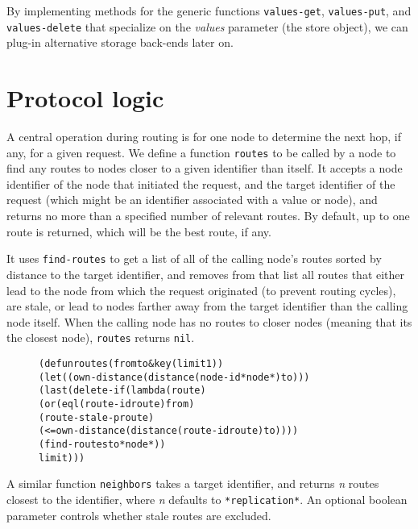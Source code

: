 \documentclass [a4paper,12pt,oneside]{article}\usepackage [paper=a4paper,left=37.5264mm,right=37.5264mm,top=37.5264mm,bottom=37.5264mm]{geometry}\usepackage {graphicx}\usepackage {tabularx}\usepackage {alltt}\usepackage {float}\usepackage [section]{placeins}\usepackage {titling}\setlength {\droptitle }{-4em}\pretitle {\begin {flushright}\bfseries \LARGE }\posttitle {\end {flushright}}\preauthor {\begin {flushright}}\postauthor {\end {flushright}}\predate {\begin {flushright}}\postdate {\end {flushright}}\usepackage [english]{babel}\usepackage [T1]{fontenc}\usepackage [utf8x]{inputenc}\usepackage {stmaryrd}\usepackage {amsfonts}\DeclareUnicodeCharacter {12314}{$\llbracket $}\DeclareUnicodeCharacter {12315}{$\rrbracket $}\DeclareUnicodeCharacter {9655}{$\rhd $}\newcommand \nobreakdash {\mbox {-}}\DeclareUnicodeCharacter {8209}{\nobreakdash }\usepackage [sc]{mathpazo}\linespread {1.05}\usepackage [font={small},labelformat=empty,labelsep=none]{caption}\tolerance=10000 \clubpenalty=10000 \widowpenalty=10000 \frenchspacing
\begin{document}
By implementing methods for the generic functions \texttt {values-get}, \texttt {values-put}, and \texttt {values-delete} that specialize on the \textit {values} parameter (the store object), we can plug-in alternative storage back-ends later on.



\section* {Protocol logic}

A central operation during routing is for one node to determine the next hop, if any, for a given request. We define a function \texttt {routes} to be called by a node to find any routes to nodes closer to a given identifier than itself. It accepts a node identifier of the node that initiated the request, and the target identifier of the request (which might be an identifier associated with a value or node), and returns no more than a specified number of relevant routes. By default, up to one route is returned, which will be the best route, if any.

It uses \texttt {find-routes} to get a list of all of the calling node’s routes sorted by distance to the target identifier, and removes from that list all routes that either lead to the node from which the request originated (to prevent routing cycles), are stale, or lead to nodes farther away from the target identifier than the calling node itself. When the calling node has no routes to closer nodes (meaning that its the closest node), \texttt {routes} returns \texttt {nil}.

\begin {figure}[H]\centering \begin {alltt}
(defun routes (from to \&key (limit 1))
  (let ((own-distance (distance (node-id *node*) to)))
    (last (delete-if (lambda (route)
                       (or (eql (route-id route) from)
                           (route-stale-p route)
                           (<= own-distance (distance (route-id route) to))))
                     (find-routes to *node*))
          limit)))
\end{alltt}\vspace {-1em}\end {figure}

A similar function \texttt {neighbors} takes a target identifier, and returns \textit {n} routes closest to the identifier, where \textit {n} defaults to \texttt {*replication*}. An optional boolean parameter controls whether stale routes are excluded.
\end{document}
